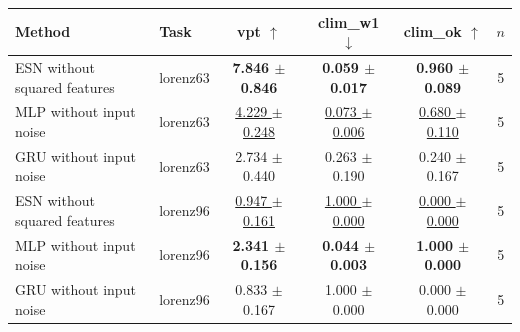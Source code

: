 \begin{tabular}{llcccc}
\toprule
Method & Task & vpt $\uparrow$ & clim\_w1 $\downarrow$ & clim\_ok $\uparrow$ & $n$ \\
\midrule
ESN without squared features & lorenz63 & \textbf{7.846 $\pm$ 0.846} & \textbf{0.059 $\pm$ 0.017} & \textbf{0.960 $\pm$ 0.089} & 5 \\
MLP without input noise & lorenz63 & \underline{4.229 $\pm$ 0.248} & \underline{0.073 $\pm$ 0.006} & \underline{0.680 $\pm$ 0.110} & 5 \\
GRU without input noise & lorenz63 & 2.734 $\pm$ 0.440 & 0.263 $\pm$ 0.190 & 0.240 $\pm$ 0.167 & 5 \\
\midrule
ESN without squared features & lorenz96 & \underline{0.947 $\pm$ 0.161} & \underline{1.000 $\pm$ 0.000} & \underline{0.000 $\pm$ 0.000} & 5 \\
MLP without input noise & lorenz96 & \textbf{2.341 $\pm$ 0.156} & \textbf{0.044 $\pm$ 0.003} & \textbf{1.000 $\pm$ 0.000} & 5 \\
GRU without input noise & lorenz96 & 0.833 $\pm$ 0.167 & 1.000 $\pm$ 0.000 & 0.000 $\pm$ 0.000 & 5 \\
\bottomrule
\end{tabular}
